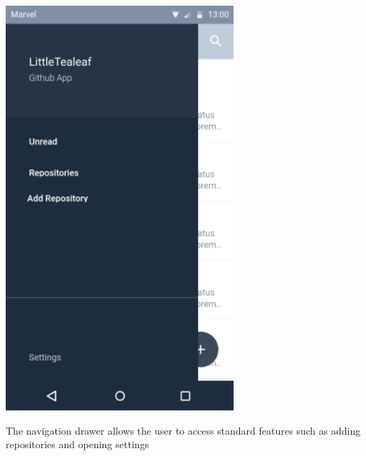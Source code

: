 \documentclass{report}
\begin{document}
\begin{center}
    \includegraphics[scale=0.6]{design-nav-drawer}
\end{center}
The navigation drawer allows the user to access standard features such as adding repositories and opening settings


\newpage
\end{document}
